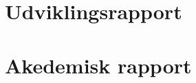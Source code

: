 




\setcounter{page}{-100}
\frontmatter
{}
\pagestyle{empty}


\cleardoublepage
\pagestyle{ruled}


\tableofcontents*
\newpage
\thispagestyle{empty}
\hspace{1cm}
\newpage

\mainmatter
\part{Udviklingsrapport}






\part{Akedemisk rapport}


\newpage
	




\appendix



